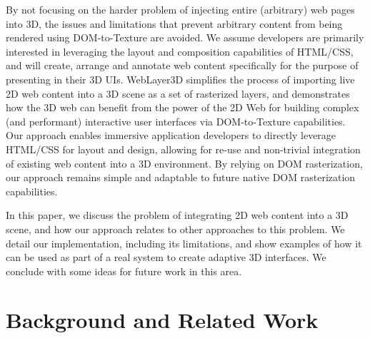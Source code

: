 \documentclass[sigconf]{acmart}
\begin{document}
By not focusing on the harder problem of injecting entire (arbitrary) web pages into 3D, the issues and limitations that prevent arbitrary content from being rendered using DOM-to-Texture are avoided.  We assume developers are primarily interested in leveraging the layout and composition capabilities of HTML/CSS, and will create, arrange and annotate web content specifically for the purpose of presenting in their 3D UIs. WebLayer3D simplifies the process of importing live 2D web content into a 3D scene as a set of rasterized layers, and demonstrates how the 3D web can benefit from the power of the 2D Web for building complex (and performant) interactive user interfaces via DOM-to-Texture capabilities. Our approach enables immersive application developers to directly leverage HTML/CSS for layout and design, allowing for re-use and non-trivial integration of existing web content into a 3D environment. By relying on DOM rasterization, our approach remains simple and adaptable to future native DOM rasterization capabilities. 

In this paper, we discuss the problem of integrating 2D web content into a 3D scene, and how our approach relates to other approaches to this problem. We detail our implementation, including its limitations, and show examples of how it can be used as part of a real system to create adaptive 3D interfaces. We conclude with some ideas for future work in this area.

\section{Background and Related Work}
\end{document}
